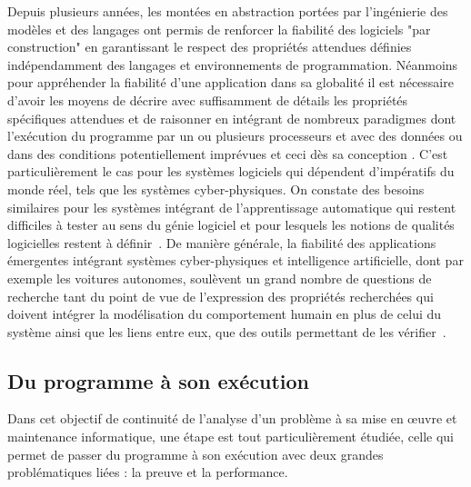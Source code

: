 \documentclass[11pt]{article}
\newcommand{\defi}[1]{\cite[défi]{#1}}
\begin{document}
Depuis plusieurs années, les montées en abstraction portées par l'ingénierie des modèles et des langages ont permis de renforcer la fiabilité des logiciels "par construction" en garantissant le respect des propriétés attendues définies indépendamment des langages et environnements de programmation. 
Néanmoins pour appréhender la fiabilité d'une application dans sa globalité il est nécessaire d'avoir les moyens de décrire avec suffisamment de détails les propriétés spécifiques attendues et de raisonner en intégrant de nombreux paradigmes dont l’exécution du programme par un ou plusieurs processeurs et avec des données ou dans des conditions potentiellement imprévues et ceci dès sa conception \defi{reconfiguration, compilation}. 
%
C'est particulièrement le cas pour les systèmes logiciels qui dépendent d'impératifs du monde réel, tels que les systèmes cyber-physiques. 
On constate des besoins similaires pour les systèmes intégrant de l'apprentissage automatique qui restent difficiles à tester au sens du génie logiciel et pour lesquels les notions de qualités logicielles restent à définir~\defi{IA}.  
De manière générale, la fiabilité des  applications émergentes intégrant  systèmes cyber-physiques et intelligence artificielle, dont par exemple les voitures autonomes, soulèvent  un grand nombre de questions de recherche tant du point de vue de l'expression des propriétés recherchées qui doivent intégrer la modélisation du comportement humain en plus de celui du système ainsi que les liens entre eux, que des outils permettant de les vérifier~\defi{emergents}.


\subsection{Du programme à son exécution\label{ss:fiabilite:execution}}
Dans cet objectif de continuité de l'analyse d'un problème à sa mise en {\oe}uvre et maintenance informatique, une étape est tout particulièrement étudiée, celle qui permet de passer du programme à son exécution avec deux  grandes problématiques liées : la preuve et la performance.
\end{document}
